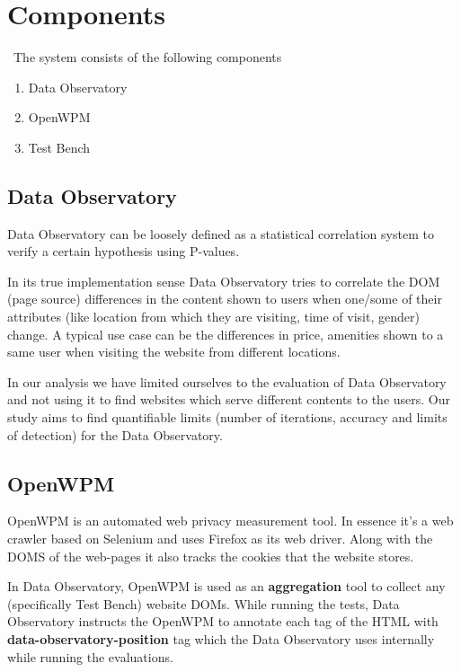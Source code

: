 \documentclass[fleqn,12pt]{SelfArx} %
\begin{document}

\section{Components}
\ The system consists of the following components
\begin{enumerate}[noitemsep]
\item Data Observatory\cite{domtool}
\item OpenWPM
\item Test Bench \cite{testbench}
\end{enumerate}

\subsection{Data Observatory}

Data Observatory can be loosely defined as a statistical correlation system to verify a certain hypothesis using P-values.\par
In its true implementation sense Data Observatory tries to correlate the DOM (page source) differences in the content shown to users when one/some of their attributes (like location from which they are visiting, time of visit, gender) change. A typical use case can be the differences in price, amenities shown to a same user when visiting the website from different locations\cite{booking}.\par
In our analysis we have limited ourselves to the evaluation of Data Observatory and not using it to find websites which serve different contents to the users. Our study aims to find quantifiable limits (number of iterations, accuracy and limits of detection) for the Data Observatory.

\subsection{OpenWPM}
OpenWPM is an automated web privacy measurement tool. In essence it’s a web crawler based on Selenium and uses Firefox as its web driver.  Along with the DOMS of the web-pages it also tracks the cookies that the website stores.\par
In Data Observatory, OpenWPM is used as an \textbf{aggregation} tool to collect any (specifically Test Bench) website DOMs. While running the tests, Data Observatory instructs the OpenWPM to annotate each tag of the HTML with \textbf{data-observatory-position} tag which the Data Observatory uses internally while running the evaluations.
\end{document}
